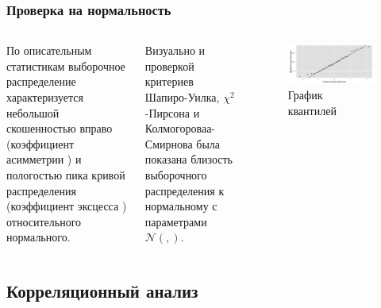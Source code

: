 \documentclass[10pt,pdf,aspectratio=169,hyperref={unicode}]{beamer}
\newcommand{\inp}[1]{}
\newcommand{\descriptive}[2]{\inp{#1/descriptive/#2}}
\newcommand{\normaldistr}{$\mathcal{N}(\descriptive{original}{mean}, \descriptive{original}{variance})$}
\begin{document}
\begin{frame}
  \frametitle{Проверка на нормальность}
  \begin{columns}[c]
  \column{2in}
  По описательным статистикам выборочное распределение характеризуется небольшой скошенностью вправо (коэффициент асимметрии $ \descriptive{original}{skew} $) и пологостью пика кривой распределения (коэффициент эксцесса $ \descriptive{original}{kurtosis} $) относительного нормального.

  \vspace{0.5em}

  Визуально и проверкой критериев Шапиро-Уилка, $\chi^2$-Пирсона и Колмогороваа-Смирнова была показана близость выборочного распределения к нормальному с параметрами \normaldistr.
  \column{4in}
  \begin{figure}[h]
    \includegraphics[width=1\linewidth]{../../figures/original/quantile.png}
    \caption{График квантилей}
  \end{figure}
  \end{columns}
\end{frame}

\subsection{Корреляционный анализ}
\end{document}
